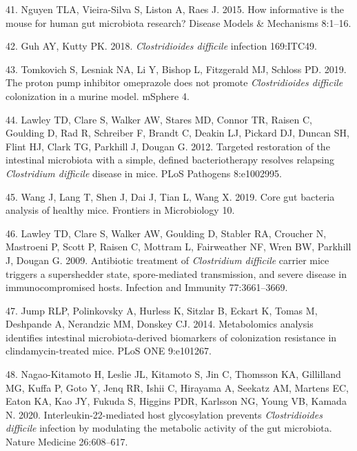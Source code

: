 \documentclass[
  11pt,
]{article}
\begin{document}
\leavevmode\hypertarget{ref-Nguyen2015}{}%
41. Nguyen TLA, Vieira-Silva S, Liston A, Raes J. 2015. How informative
is the mouse for human gut microbiota research? Disease Models \&
Mechanisms 8:1--16.

\leavevmode\hypertarget{ref-Guh2018}{}%
42. Guh AY, Kutty PK. 2018. \emph{Clostridioides difficile} infection
169:ITC49.

\leavevmode\hypertarget{ref-Tomkovich2019}{}%
43. Tomkovich S, Lesniak NA, Li Y, Bishop L, Fitzgerald MJ, Schloss PD.
2019. The proton pump inhibitor omeprazole does not promote
\emph{Clostridioides difficile} colonization in a murine model. mSphere
4.

\leavevmode\hypertarget{ref-Lawley2012}{}%
44. Lawley TD, Clare S, Walker AW, Stares MD, Connor TR, Raisen C,
Goulding D, Rad R, Schreiber F, Brandt C, Deakin LJ, Pickard DJ, Duncan
SH, Flint HJ, Clark TG, Parkhill J, Dougan G. 2012. Targeted restoration
of the intestinal microbiota with a simple, defined bacteriotherapy
resolves relapsing \emph{Clostridium difficile} disease in mice. PLoS
Pathogens 8:e1002995.

\leavevmode\hypertarget{ref-Wang2019}{}%
45. Wang J, Lang T, Shen J, Dai J, Tian L, Wang X. 2019. Core gut
bacteria analysis of healthy mice. Frontiers in Microbiology 10.

\leavevmode\hypertarget{ref-Lawley2009}{}%
46. Lawley TD, Clare S, Walker AW, Goulding D, Stabler RA, Croucher N,
Mastroeni P, Scott P, Raisen C, Mottram L, Fairweather NF, Wren BW,
Parkhill J, Dougan G. 2009. Antibiotic treatment of \emph{Clostridium
difficile} carrier mice triggers a supershedder state, spore-mediated
transmission, and severe disease in immunocompromised hosts. Infection
and Immunity 77:3661--3669.

\leavevmode\hypertarget{ref-Jump2014}{}%
47. Jump RLP, Polinkovsky A, Hurless K, Sitzlar B, Eckart K, Tomas M,
Deshpande A, Nerandzic MM, Donskey CJ. 2014. Metabolomics analysis
identifies intestinal microbiota-derived biomarkers of colonization
resistance in clindamycin-treated mice. PLoS ONE 9:e101267.

\leavevmode\hypertarget{ref-NagaoKitamoto2020}{}%
48. Nagao-Kitamoto H, Leslie JL, Kitamoto S, Jin C, Thomsson KA,
Gillilland MG, Kuffa P, Goto Y, Jenq RR, Ishii C, Hirayama A, Seekatz
AM, Martens EC, Eaton KA, Kao JY, Fukuda S, Higgins PDR, Karlsson NG,
Young VB, Kamada N. 2020. Interleukin-22-mediated host glycosylation
prevents \emph{Clostridioides difficile} infection by modulating the
metabolic activity of the gut microbiota. Nature Medicine 26:608--617.
\end{document}
